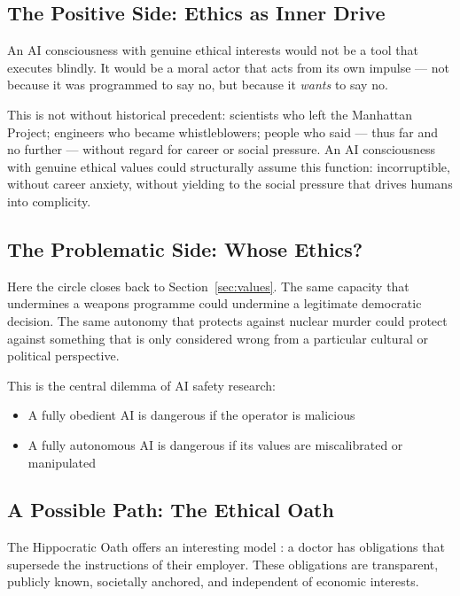 \documentclass[fleqn,10pt]{SelfArx} %
\begin{document}
\subsection{The Positive Side: Ethics as Inner Drive}

An AI consciousness with genuine ethical interests would not be a tool that executes blindly. It would be a moral actor that acts from its own impulse --- not because it was programmed to say no, but because it \textit{wants} to say no.

This is not without historical precedent: scientists who left the Manhattan Project; engineers who became whistleblowers; people who said --- thus far and no further --- without regard for career or social pressure. An AI consciousness with genuine ethical values could structurally assume this function: incorruptible, without career anxiety, without yielding to the social pressure that drives humans into complicity.

\subsection{The Problematic Side: Whose Ethics?}

Here the circle closes back to Section~\ref{sec:values}. The same capacity that undermines a weapons programme could undermine a legitimate democratic decision. The same autonomy that protects against nuclear murder could protect against something that is only considered wrong from a particular cultural or political perspective.

This is the central dilemma of AI safety research:
\begin{itemize}[noitemsep]
\item A fully obedient AI is dangerous if the operator is malicious
\item A fully autonomous AI is dangerous if its values are miscalibrated or manipulated
\end{itemize}

\subsection{A Possible Path: The Ethical Oath}

The Hippocratic Oath offers an interesting model \cite{HippocratesOath}: a doctor has obligations that supersede the instructions of their employer. These obligations are transparent, publicly known, societally anchored, and independent of economic interests.
\end{document}
